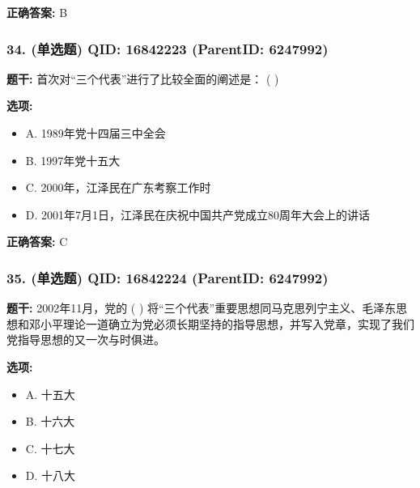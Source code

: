 \documentclass[12pt,UTF8]{ctexart}
\begin{document}
\textbf{正确答案:}
B

\vspace{0.3em}\hrulefill\vspace{0.7em}

\subsubsection*{34. (单选题) \small QID: 16842223 (ParentID: 6247992)}

\textbf{题干:}
首次对“三个代表”进行了比较全面的阐述是： ( )



\textbf{选项:}
\begin{itemize}[leftmargin=*]

  \item A. 1989年党十四届三中全会

  \item B. 1997年党十五大

  \item C. 2000年，江泽民在广东考察工作时

  \item D. 2001年7月1日，江泽民在庆祝中国共产党成立80周年大会上的讲话

\end{itemize}

\textbf{正确答案:}
C

\vspace{0.3em}\hrulefill\vspace{0.7em}

\subsubsection*{35. (单选题) \small QID: 16842224 (ParentID: 6247992)}

\textbf{题干:}
2002年11月，党的 ( ) 将“三个代表”重要思想同马克思列宁主义、毛泽东思想和邓小平理论一道确立为党必须长期坚持的指导思想，并写入党章，实现了我们党指导思想的又一次与时俱进。



\textbf{选项:}
\begin{itemize}[leftmargin=*]

  \item A. 十五大

  \item B. 十六大

  \item C. 十七大

  \item D. 十八大

\end{itemize}
\end{document}
